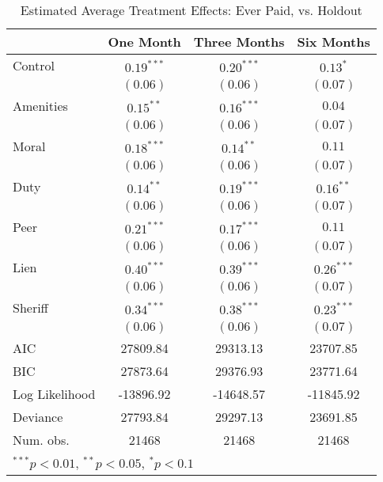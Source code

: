 \documentclass[12pt,titlepage]{article}
\begin{document}
\begin{table}[htbp]
\caption{Estimated Average Treatment Effects: Ever Paid, vs. Holdout}
\begin{center}
\begin{tabular}{l c c c }
\hline
               & One Month & Three Months & Six Months \\
\hline
Control        & $0.19^{***}$ & $0.20^{***}$ & $0.13^{*}$   \\
               & $(0.06)$     & $(0.06)$     & $(0.07)$     \\
Amenities      & $0.15^{**}$  & $0.16^{***}$ & $0.04$       \\
               & $(0.06)$     & $(0.06)$     & $(0.07)$     \\
Moral          & $0.18^{***}$ & $0.14^{**}$  & $0.11$       \\
               & $(0.06)$     & $(0.06)$     & $(0.07)$     \\
Duty           & $0.14^{**}$  & $0.19^{***}$ & $0.16^{**}$  \\
               & $(0.06)$     & $(0.06)$     & $(0.07)$     \\
Peer           & $0.21^{***}$ & $0.17^{***}$ & $0.11$       \\
               & $(0.06)$     & $(0.06)$     & $(0.07)$     \\
Lien           & $0.40^{***}$ & $0.39^{***}$ & $0.26^{***}$ \\
               & $(0.06)$     & $(0.06)$     & $(0.07)$     \\
Sheriff        & $0.34^{***}$ & $0.38^{***}$ & $0.23^{***}$ \\
               & $(0.06)$     & $(0.06)$     & $(0.07)$     \\
\hline
AIC            & 27809.84     & 29313.13     & 23707.85     \\
BIC            & 27873.64     & 29376.93     & 23771.64     \\
Log Likelihood & -13896.92    & -14648.57    & -11845.92    \\
Deviance       & 27793.84     & 29297.13     & 23691.85     \\
Num. obs.      & 21468        & 21468        & 21468        \\
\hline
\multicolumn{4}{l}{\scriptsize{$^{***}p<0.01$, $^{**}p<0.05$, $^*p<0.1$}}
\end{tabular}
\label{tbl:reg8_ep}
\end{center}
\end{table}
\end{document}

